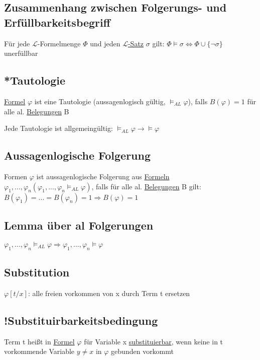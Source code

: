\documentclass[12pt,a4paper]{article} %
\begin{document}
	\subsection{Zusammenhang zwischen Folgerungs- und Erfüllbarkeitsbegriff}
	Für jede $\mathcal{L}$-Formelmenge $\Phi$ und jeden \hyperref[LSatz]{$\mathcal{L}$-Satz} $\sigma$ gilt: $\Phi \hyperref[Erfullbar]{\vDash} \sigma \Leftrightarrow \Phi \cup \{\neg \sigma\}$ unerfüllbar
	
	\subsection{*Tautologie}
	\hyperref[Formel]{Formel} $\varphi$ ist eine Tautologie (aussagenlogisch gültig, $\hyperref[Erfullbar]{\vDash_{AL}} \varphi$), falls $B(\varphi) = 1$ für alle al. \hyperref[Belegung]{Belegungen} B
	
	Jede Tautologie ist allgemeingültig: $\hyperref[Erfullbar]{\vDash_{AL}} \varphi \rightarrow \hyperref[Erfullbar]{\vDash} \varphi$
	
	\subsection{Aussagenlogische Folgerung}
	Formen $\varphi$ ist aussagenlogische Folgerung aus \hyperref[Formel]{Formeln} \newline 
	$\varphi_1, ..., \varphi_n (\varphi_1, ..., \varphi_n \hyperref[Erfullbar]{\vDash_{AL}} \varphi)$, falls für alle al. \hyperref[Belegung]{Belegungen} B gilt: \newline
	$B(\varphi_1) = ... = B(\varphi_n) = 1 \Rightarrow B(\varphi) = 1$
	
	\subsection{Lemma über al Folgerungen}
	$\varphi_1, ..., \varphi_n \hyperref[Erfullbar]{\vDash_{AL}} \varphi \Rightarrow \varphi_1, ..., \varphi_n \hyperref[Erfullbar]{\vDash} \varphi$
	
	\subsection{Substitution}
	\label{Substituierbar}
	$\varphi[t/x]$: alle freien vorkommen von x durch Term t ersetzen
	
	\subsection{!Substituirbarkeitsbedingung}
	Term t heißt in \hyperref[Formel]{Formel} $\varphi$ für Variable x \hyperref[Substituierbar]{substituierbar}, wenn keine in t vorkommende Variable $y \ne x$ in $\varphi$ gebunden vorkommt
	
\end{document}
